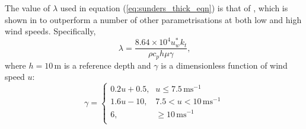 \documentclass[../tex_main/NEMO_manual]{subfiles}
\begin{document}
The value of $\lambda$ used in equation (\autoref{eq:sunders_thick_eqn}) is that of
\citet{Artale_al_JGR02},
which is shown in \citet{Tu_Tsuang_GRL05} to outperform a number of other
parametrisations at both low and high wind speeds. Specifically,
\begin{equation}
\label{eq:artale_lambda_eqn}
\lambda = \frac{ 8.64\times10^4 u^*_{w} k_t }{ \rho c_p h \mu \gamma }\mbox{,}
\end{equation}
where $h=10$\,m is a reference depth and
$\gamma$ is a dimensionless function of wind speed $u$:
\begin{equation}
\label{eq:artale_gamma_eqn}
\gamma = \left\{ \begin{matrix}
                     0.2u+0.5\mbox{,} & u \le 7.5\,\mbox{ms}^{-1} \\
                     1.6u-10\mbox{,} & 7.5 < u < 10\,\mbox{ms}^{-1} \\
                     6\mbox{,} & \ge 10\,\mbox{ms}^{-1} \\
                 \end{matrix}
          \right.
\end{equation}
\end{document}
